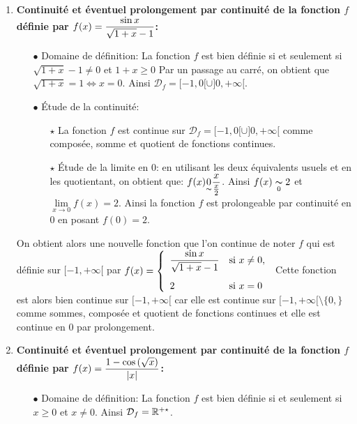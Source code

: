 \documentclass[a4paper, 11pt,reqno]{article}
\begin{document}
\begin{correction}
\begin{enumerate}
		\item \textbf{Continuit\'e et \'eventuel prolongement par continuit\'e de la fonction $f$ d\'efinie par $f(x)=\displaystyle\frac{\sin{x}}{\sqrt{1+x}-1}$:}
		      \begin{itemize}
			      \item[$\bullet$] Domaine de d\'efinition: La fonction $f$ est bien d\'efinie si et seulement si $\sqrt{1+x}-1\not= 0$ et $1+x\geq 0$ Par un passage au carr\'e, on obtient que $\sqrt{1+x}=1\Leftrightarrow x=0$. Ainsi $\mathcal{D}_{f}=\lbrack -1,0\lbrack\cup\rbrack 0,+\infty\lbrack$.
			      \item[$\bullet$] \'Etude de la continuit\'e:
			            \begin{itemize}
				            \item[$\star$] La fonction $f$ est continue sur $\mathcal{D}_{f}=\lbrack -1,0\lbrack\cup\rbrack 0,+\infty\lbrack$ comme compos\'ee, somme et quotient de fonctions continues.
				            \item[$\star$] \'Etude de la limite en 0: en utilisant les deux \'equivalents usuels et en les quotientant, on obtient que: $f(x)\underset{\thicksim}{0} \displaystyle\frac{x}{\frac{x}{2}}$. Ainsi $f(x)\underset{0}{\thicksim} 2$ et $\lim\limits_{x\to 0} f(x)=2$. Ainsi la fonction $f$ est prolongeable par continuit\'e en 0 en posant $f(0)=2$.
			            \end{itemize}
		      \end{itemize}
		      On obtient alors une nouvelle fonction que l'on continue de noter $f$ qui est d\'efinie sur $\lbrack -1,+\infty\lbrack$ par $f(x)=\left\lbrace \begin{array}{ll}  \ddp\frac{\sin{x}}{\sqrt{1+x}-1}& \hbox{si}\ x\not= 0,\vsec\\ 2 & \hbox{si}\ x=0  \end{array}\right.$ Cette fonction est alors bien continue sur $\lbrack -1,+\infty\lbrack$ car elle est continue sur $\lbrack -1,+\infty\lbrack\setminus\lbrace 0,\rbrace$ comme  sommes, compos\'ee et quotient de fonctions continues et elle est continue en 0 par prolongement.
		\item \textbf{Continuit\'e et \'eventuel prolongement par continuit\'e de la fonction $f$ d\'efinie par $f(x)=\displaystyle\frac{1-\cos{(\sqrt{x})}}{|x|}$:}
		      \begin{itemize}
			      \item[$\bullet$] Domaine de d\'efinition: La fonction $f$ est bien d\'efinie si et seulement si $x\geq 0$ et $x\not= 0$. Ainsi $\mathcal{D}_{f}=\mathbb{R}^{+\star}$.

\end{itemize}
\end{enumerate}
\end{correction}
\end{document}
